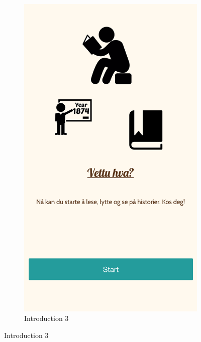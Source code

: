 \begin{appendices}
\begin{figure}[h]
\begin{subfigure}[h]{0.3\textwidth}
			\includegraphics[width=\textwidth]{fig/screenshot_intro3}
			\caption{Introduction 3}
		\end{subfigure}


\end{figure}
\end{appendices}
